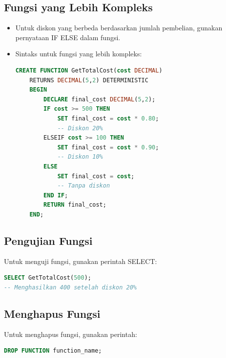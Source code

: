 \documentclass{article}
\begin{document}
\subsection{Fungsi yang Lebih Kompleks}
\begin{itemize}
    \item Untuk diskon yang berbeda berdasarkan jumlah pembelian, gunakan pernyataan IF ELSE dalam fungsi.
    \item Sintaks untuk fungsi yang lebih kompleks:
          \begin{lstlisting}[language=SQL, caption={}, captionpos=b]
CREATE FUNCTION GetTotalCost(cost DECIMAL)
    RETURNS DECIMAL(5,2) DETERMINISTIC
    BEGIN
        DECLARE final_cost DECIMAL(5,2);
        IF cost >= 500 THEN
            SET final_cost = cost * 0.80; 
            -- Diskon 20%
        ELSEIF cost >= 100 THEN
            SET final_cost = cost * 0.90; 
            -- Diskon 10%
        ELSE
            SET final_cost = cost; 
            -- Tanpa diskon
        END IF;
        RETURN final_cost;
    END;
\end{lstlisting}
\end{itemize}

\subsection{Pengujian Fungsi}
Untuk menguji fungsi, gunakan perintah SELECT:
\begin{lstlisting}[language=SQL, caption={}, captionpos=b]
SELECT GetTotalCost(500); 
-- Menghasilkan 400 setelah diskon 20%
\end{lstlisting}

\subsection{Menghapus Fungsi}
Untuk menghapus fungsi, gunakan perintah:
\begin{lstlisting}[language=SQL, caption={}, captionpos=b]
DROP FUNCTION function_name;
\end{lstlisting}
\end{document}

